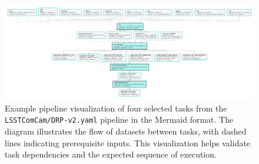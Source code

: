 \begin{figure}
    \centering
    \includegraphics[width=\textwidth]{figures/pipe_viz_comcam_subset.pdf}
    \caption{
        Example pipeline visualization of four selected tasks from the \texttt{LSSTComCam/DRP-v2.yaml} pipeline in the Mermaid format.
        The diagram illustrates the flow of datasets between tasks, with dashed lines indicating prerequisite inputs.
        This visualization helps validate task dependencies and the expected sequence of execution.
    }
    \label{fig:pipe_viz}
\end{figure}
